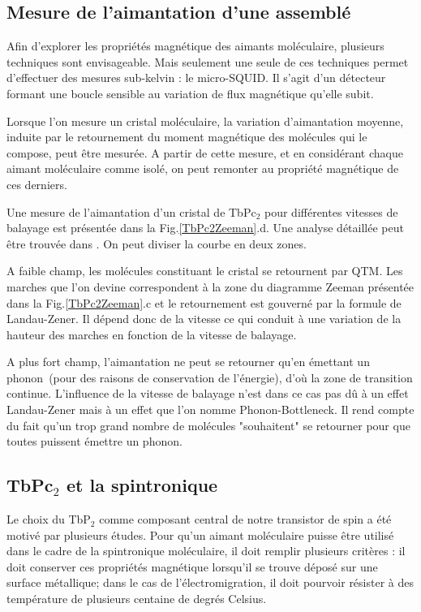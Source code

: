 \subsection{Mesure de l'aimantation d'une assemblé}
Afin d'explorer les propriétés magnétique des aimants moléculaire, plusieurs techniques sont envisageable. Mais seulement une seule de ces techniques permet d'effectuer des mesures sub-kelvin : le micro-SQUID. Il s'agit d'un détecteur formant une boucle sensible au variation de flux magnétique qu'elle subit.

Lorsque l'on mesure un cristal moléculaire, la variation d'aimantation moyenne, induite par le retournement du moment magnétique des molécules qui le compose, peut être mesurée. A partir de cette mesure, et en considérant chaque aimant moléculaire comme isolé, on peut remonter au propriété magnétique de ces derniers.

Une mesure de l'aimantation d'un cristal de TbPc$_2$ pour différentes vitesses de balayage est présentée dans la Fig.\ref{TbPc2Zeeman}.d. Une analyse détaillée peut \^etre trouvée dans \cite{Ishikawa2005}. On peut diviser la courbe en deux zones. 

A faible champ, les molécules constituant le cristal se retournent par QTM. Les marches que l'on devine correspondent à la zone du diagramme Zeeman présentée dans la Fig.\ref{TbPc2Zeeman}.c et le retournement est gouverné par la formule de Landau-Zener. Il dépend donc de la vitesse ce qui conduit à une variation de la hauteur des marches en fonction de la vitesse de balayage. 

A plus fort champ, l'aimantation ne peut se retourner qu'en émettant un phonon~(pour des raisons de conservation de l'énergie), d'où la zone de transition continue. L'influence de la vitesse de balayage n'est dans ce cas pas d\^u à un effet Landau-Zener mais à un effet que l'on nomme Phonon-Bottleneck. Il rend compte du fait qu'un trop grand nombre de molécules "souhaitent" se retourner pour que toutes puissent émettre un phonon.

\subsection{TbPc$_2$ et la spintronique}
Le choix du TbP$_{2}$ comme composant central de notre transistor de spin a été motivé par plusieurs études. Pour qu'un aimant moléculaire puisse être utilisé dans le cadre de la spintronique moléculaire, il doit remplir plusieurs critères : il doit conserver ces propriétés magnétique lorsqu'il se trouve déposé sur une surface métallique; dans le cas de l'électromigration, il doit pourvoir résister à des température de plusieurs centaine de degrés Celsius.

